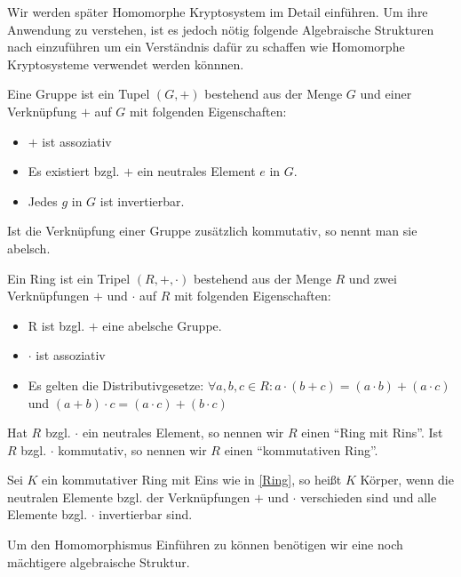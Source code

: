 Wir werden später Homomorphe Kryptosystem im Detail einführen. Um ihre Anwendung zu verstehen, ist es jedoch nötig folgende Algebraische Strukturen nach \cite{tr2015la} einzuführen um ein Verständnis dafür zu schaffen wie Homomorphe Kryptosysteme verwendet werden könnnen.

\begin{theorem}[Gruppe]
	Eine Gruppe ist ein Tupel $(G,+)$ bestehend aus der Menge $G$ und einer Verknüpfung $+$ auf $G$ mit folgenden Eigenschaften:
	\begin{itemize}
		\item $+$ ist assoziativ
		\item Es existiert bzgl. $+$ ein neutrales Element $e$ in $G$.
		\item Jedes $g$ in $G$ ist invertierbar.
	\end{itemize}
	
	Ist die Verknüpfung einer Gruppe zusätzlich kommutativ, so nennt man sie abelsch.
	
\end{theorem}

\begin{theorem}[Ring]
	\label{Ring}
	Ein Ring ist ein Tripel $(R,+,\cdot)$ bestehend aus der Menge $R$ und zwei Verknüpfungen $+$ und $\cdot$ auf $R$ mit folgenden Eigenschaften:
	\begin{itemize}
		\item R ist bzgl. $+$ eine abelsche Gruppe.
		\item $\cdot$ ist assoziativ
		\item Es gelten die Distributivgesetze: $\forall a,b,c\in R: a\cdot(b+c)=(a\cdot b)+(a\cdot c)$ und $(a+b)\cdot c = (a\cdot c)+(b\cdot c)$
	\end{itemize}
\end{theorem}

Hat $R$ bzgl. $\cdot$ ein neutrales Element, so nennen wir $R$ einen \enquote{Ring mit Rins}. Ist $R$ bzgl. $\cdot$ kommutativ, so nennen wir $R$ einen \enquote{kommutativen Ring}. 

\begin{theorem}[Körper]
	Sei $K$ ein kommutativer Ring mit Eins wie in \ref{Ring}, so heißt $K$ Körper, wenn die neutralen Elemente bzgl. der Verknüpfungen $+$ und $\cdot$ verschieden sind und alle Elemente bzgl. $\cdot$ invertierbar sind.
	
\end{theorem}

Um den Homomorphismus Einführen zu können benötigen wir eine noch mächtigere algebraische Struktur.


